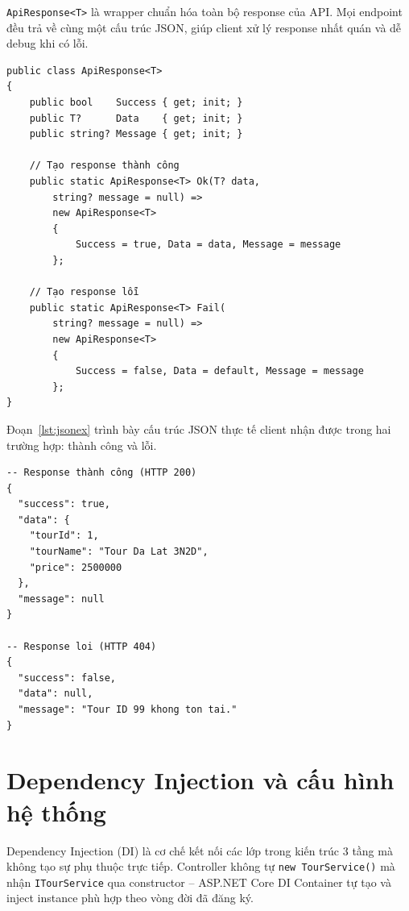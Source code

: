 \begin{de}\label{def3.10}
\texttt{ApiResponse<T>} là wrapper chuẩn hóa toàn bộ response
của API. Mọi endpoint đều trả về cùng một cấu trúc JSON, giúp
client xử lý response nhất quán và dễ debug khi có lỗi.
\end{de}

\begin{lstlisting}[style=csharp,
  caption={ApiResponse<T> -- wrapper chuẩn hóa response},
  label={lst:apiresponse}]
public class ApiResponse<T>
{
    public bool    Success { get; init; }
    public T?      Data    { get; init; }
    public string? Message { get; init; }

    // Tạo response thành công
    public static ApiResponse<T> Ok(T? data,
        string? message = null) =>
        new ApiResponse<T>
        {
            Success = true, Data = data, Message = message
        };

    // Tạo response lỗi
    public static ApiResponse<T> Fail(
        string? message = null) =>
        new ApiResponse<T>
        {
            Success = false, Data = default, Message = message
        };
}
\end{lstlisting}

Đoạn~\ref{lst:jsonex} trình bày cấu trúc JSON thực tế
client nhận được trong hai trường hợp: thành công và lỗi.

\begin{lstlisting}[style=sql,
  caption={Cấu trúc JSON response chuẩn hóa},
  label={lst:jsonex}]
-- Response thành công (HTTP 200)
{
  "success": true,
  "data": {
    "tourId": 1,
    "tourName": "Tour Da Lat 3N2D",
    "price": 2500000
  },
  "message": null
}

-- Response loi (HTTP 404)
{
  "success": false,
  "data": null,
  "message": "Tour ID 99 khong ton tai."
}
\end{lstlisting}

\section{Dependency Injection và cấu hình hệ thống}\label{Sec3.6}

\begin{de}\label{def3.11}
Dependency Injection (DI) là cơ chế kết nối các lớp trong
kiến trúc 3 tầng mà không tạo sự phụ thuộc trực tiếp.
Controller không tự \texttt{new TourService()} mà nhận
\texttt{ITourService} qua constructor -- ASP.NET Core DI
Container tự tạo và inject instance phù hợp theo vòng đời
đã đăng ký.
\end{de}

